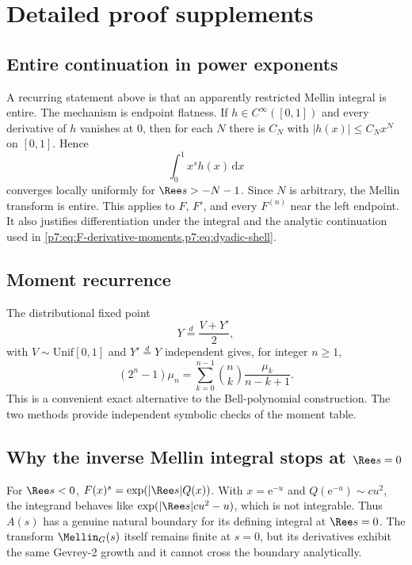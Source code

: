 \documentclass[11pt,oneside]{article}
\theoremstyle{definition}
\theoremstyle{remark}
\newcommand{\dd}{\,\mathrm d}
\newcommand{\e}{\mathrm e}
\newcommand{\1}{\mathbf 1}
\begin{document}
\appendix
\section{Detailed proof supplements}
\label{p7:app:proofs}

\subsection{Entire continuation in power exponents}

A recurring statement above is that an apparently restricted Mellin integral is entire.  The
mechanism is endpoint flatness.  If $h\in C^\infty([0,1])$ and every derivative of $h$ vanishes
at $0$, then for each $N$ there is $C_N$ with $|h(x)|\le C_Nx^N$ on $[0,1]$.  Hence
\[
 \int_0^1x^sh(x)\dd x
\]
converges locally uniformly for $\Ree s>-N-1$.  Since $N$ is arbitrary, the Mellin transform
is entire.  This applies to $F$, $F'$, and every $F^{(n)}$ near the left endpoint.  It also
justifies differentiation under the integral and the analytic continuation used in
\cref{p7:eq:F-derivative-moments,p7:eq:dyadic-shell}.

\subsection{Moment recurrence}

The distributional fixed point
\begin{equation}
 Y\overset d=\frac{V+Y'}2,
 \label{p7:eq:Y-fixed-point}
\end{equation}
with $V\sim\mathrm{Unif}[0,1]$ and $Y'\overset d=Y$ independent gives, for integer $n\ge1$,
\begin{equation}
 (2^n-1)\mu_n
 =\sum_{k=0}^{n-1}\binom nk\frac{\mu_k}{n-k+1}.
 \label{p7:eq:moment-recurrence}
\end{equation}
This is a convenient exact alternative to the Bell-polynomial construction.  The two methods
provide independent symbolic checks of the moment table.

\subsection{Why the inverse Mellin integral stops at $\Ree s=0$}

For $\Ree s<0$, $F(x)^s=\exp(|\Ree s|Q(x))$.  With $x=\e^{-u}$ and
$Q(\e^{-u})\sim cu^2$, the integrand behaves like
$\exp(|\Ree s|cu^2-u)$, which is not integrable.  Thus $A(s)$ has a genuine natural boundary
for its defining integral at $\Ree s=0$.  The transform $\Mellin_G(s)$ itself remains finite at
$s=0$, but its derivatives exhibit the same Gevrey-2 growth and it cannot cross the boundary
analytically.
\end{document}
